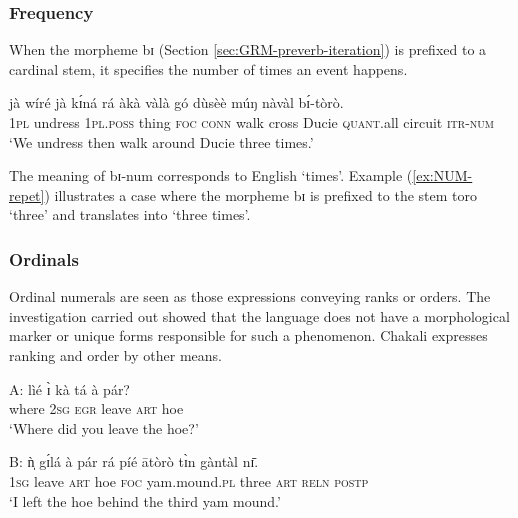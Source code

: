 \begin{exe}
\begin{exe}
\begin{exe}
\begin{exe}
\begin{exe}
\begin{exe}
\begin{exe}
\begin{exe}
\begin{exe}
\begin{exe}
\subsubsection{Frequency}
\label{sec:NUM-repet}

When the morpheme {\sls bɪ}  (Section
\ref{sec:GRM-preverb-iteration}) is prefixed to a cardinal   stem, it
specifies the number of times an event happens. 

 


\ea\label{ex:NUM-repet}
 \gll jà wíré jà kɪ́ná rá àkà vàlà gó dùsèè múŋ nàvàl bɪ́-tòrò.\\
 \textsc{1pl} undress  \textsc{1pl.poss} thing \textsc{foc}  \textsc{conn} 
walk cross Ducie  \textsc{quant}.all  circuit \textsc{itr-num}\\
\glt  `We undress then walk around Ducie three times.' 
\z

The meaning of {\sls bɪ}-{\sc num} corresponds to English `times'.  Example (\ref{ex:NUM-repet}) illustrates a  case where  the morpheme {\sls bɪ} is prefixed to the  stem {\sls toro} `three' and translates into `three times'.



\subsubsection{Ordinals}
\label{sec:NUM-partitive}


Ordinal numerals are seen as those expressions conveying ranks or orders. The investigation carried out  showed that the language does not have a morphological marker or unique forms responsible for such a phenomenon. Chakali expresses ranking and order by other means.

\ea
\ea\label{ex:thirdmound}
\gll A: lìé ɪ̀ kà tá à pár?\\
 {} {where} \textsc{2sg} \textsc{egr} {leave} \textsc{art} {hoe}\\
\glt   `Where did you leave the hoe?'

\ex\label{ex:thirdmound-2}
\gll B: ǹ̩ gɪ́lá à pár rá píé ātòrò tɪ̀n  gàntàl  nɪ̄.\\
 {}  \textsc{1sg}  {leave} \textsc{art}   {hoe} \textsc{foc} 
 {yam.mound.\textsc{pl}} {three} \textsc{art}  \textsc{reln}  \textsc{postp}\\
\glt   `I left the hoe behind the third yam mound.'


\end{exe}
\end{exe}
\end{exe}
\end{exe}
\end{exe}
\end{exe}
\end{exe}
\end{exe}
\end{exe}
\end{exe}
